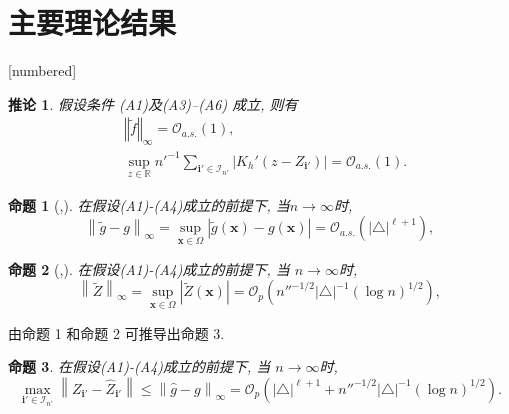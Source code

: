 \documentclass{beamer}
\newtheorem{proposition}{命题}
\newtheorem{coro}{推论}
\begin{document}
\section{主要理论结果}
\begingroup
{}[numbered]
\setcounter{proposition}{0}
\begin{frame}
\footnotesize
\begin{coro}\label{colrollary:ftilde}
假设条件 (A1)及(A3)--(A6) 成立, 则有
\begin{align*}
    &\left\Vert \tilde{f} \right\Vert_{\infty} = \mathcal{O}_{a.s.}(1),\\
    &\sup_{z\in\mathbb{R}} n'^{-1}\sum_{\mathbf{i}'\in\mathcal{I}_{n'}}
    \left\vert K_h'(z-Z_{\mathbf{i}'}) \right\vert = \mathcal{O}_{a.s.}(1).
\end{align*}
\end{coro}

\begin{proposition}[\cite{Yao2003ExponentialIF},\cite{bosq2012nonparametric}]
    在假设(A1)-(A4)成立的前提下, 当$n\to\infty$时,
    \[
\left\lVert \tilde{g} - g \right\rVert_{\infty} = \sup_{\boldsymbol{x} \in \Omega} \left| \tilde{g}(\boldsymbol{x}) - g(\boldsymbol{x}) \right| = \mathcal{O}_{a.s.} \left( |\triangle|^{\ell+1} \right),
\]
\end{proposition}

\begin{proposition}
[\cite{lai2007spline},\cite{yu2019estimation}]
  在假设(A1)-(A4)成立的前提下, 当 $n\to\infty$时,
  \[
\left\lVert \tilde{Z} \right\rVert_{\infty} = \sup_{\boldsymbol{x} \in \Omega} \left| \tilde{Z}(\boldsymbol{x}) \right| = \mathcal{O}_p \left( n''^{-1/2} |\triangle|^{-1} (\log n)^{1/2} \right),
\]
\end{proposition}

\end{frame}

\begin{frame}
由命题 1 和命题 2 可推导出命题 3.

\begin{proposition}
    在假设(A1)-(A4)成立的前提下, 当 $n\to\infty$时,
   \[
\max_{\mathbf{i}' \in \mathcal{I}_{n'}} \left\lVert Z_{\mathbf{i}'} - \hat{Z}_{\mathbf{i}'} \right\rVert 
\le \left\lVert \hat{g} - g \right\rVert_{\infty}
= \mathcal{O}_p \left( |\triangle|^{\ell+1} + n''^{-1/2} |\triangle|^{-1} (\log n)^{1/2} \right).
\]
\end{proposition}
\end{frame}
\endgroup
\end{document}
